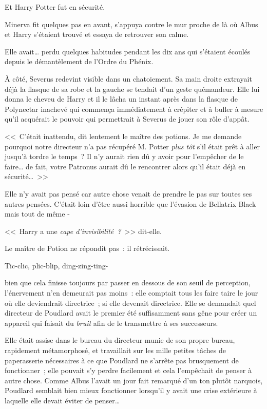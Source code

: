 Et Harry Potter fut en sécurité.

Minerva fit quelques pas en avant, s'appuya contre le mur proche de là où Albus et Harry s'étaient trouvé et essaya de retrouver son calme.

Elle avait… perdu quelques habitudes pendant les dix ans qui s'étaient écoulés depuis le démantèlement de l'Ordre du Phénix.

À côté, Severus redevint visible dans un chatoiement. Sa main droite extrayait déjà la flasque de sa robe et la gauche se tendait d'un geste quémandeur. Elle lui donna le cheveu de Harry et il le lâcha un instant après dans la flasque de Polynectar inachevé qui commença immédiatement à crépiter et à buller à mesure qu'il acquérait le pouvoir qui permettrait à Severus de jouer son rôle d'appât.

<<~C'était inattendu, dit lentement le maître des potions. Je me demande pourquoi notre directeur n'a pas récupéré M. Potter \emph{plus tôt} s'il était prêt à aller jusqu'à tordre le temps~? Il n'y aurait rien dû y avoir pour l'empêcher de le faire… de fait, votre Patronus aurait dû le rencontrer alors qu'il était déjà en sécurité…~>>

Elle n'y avait pas pensé car autre chose venait de prendre le pas sur toutes ses autres pensées. C'était loin d'être aussi horrible que l'évasion de Bellatrix Black mais tout de même -

<<~Harry a une \emph{cape d'invisibilité~?}~>> dit-elle.

Le maître de Potion ne répondit pas~: il rétrécissait.

\later

Tic-clic, plic-blip, ding-zing-ting-

bien que cela finisse toujours par passer en dessous de son seuil de perception, l'énervement n'en demeurait pas moins~: elle comptait tous les faire taire le jour où elle deviendrait directrice~; si elle devenait directrice. Elle se demandait quel directeur de Poudlard avait le premier été suffisamment sans gêne pour créer un appareil qui faisait du \emph{bruit} afin de le transmettre à ses successeurs.

Elle était assise dans le bureau du directeur munie de son propre bureau, rapidement métamorphosé, et travaillait sur les mille petites tâches de paperasserie nécessaires à ce que Poudlard ne s'arrête pas brusquement de fonctionner~; elle pouvait s'y perdre facilement et cela l'empêchait de penser à autre chose. Comme Albus l'avait un jour fait remarqué d'un ton plutôt narquois, Poudlard semblait bien mieux fonctionner lorsqu'il y avait une crise extérieure à laquelle elle devait éviter de penser…

